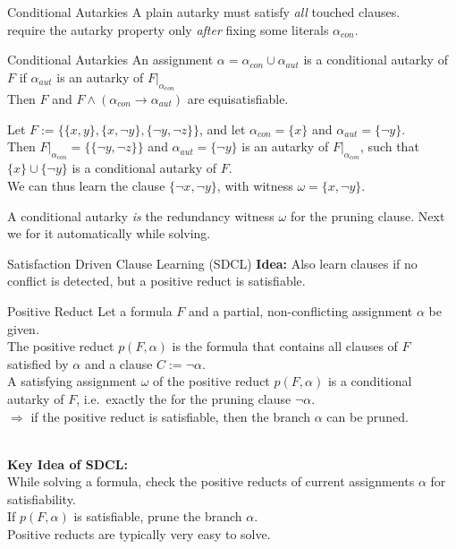 \documentclass[t]{sdqbeamer}
\begin{document}
\begin{frame}{Conditional Autarkies}
\vspace*{-2ex}
A plain autarky must satisfy \emph{all} touched clauses.\\
 require the autarky property only \emph{after} fixing some literals $\alpha_{con}$.\\[1ex]
\begin{block}{Conditional Autarkies}
An assignment $\alpha = \alpha_{con} \cup \alpha_{aut}$ is a conditional autarky of $F$ if $\alpha_{aut}$ is an autarky of $F|_{\alpha_{con}}$\\[1ex]
Then $F$ and $F \land (\alpha_{con} \rightarrow \alpha_{aut})$ are equisatisfiable.
\end{block}

\begin{example}
Let $F := \bigl\{\{x, y\}, \{x, \lnot y\}, \{\lnot y, \lnot z\}\bigr\}$, and let $\alpha_{con} = \{x\}$ and $\alpha_{aut} = \{\lnot y\}$.\\[0.5ex]
Then $F|_{\alpha_{con}} = \bigl\{\{\lnot y, \lnot z\}\bigr\}$ and $\alpha_{aut} = \{\lnot y\}$ is an autarky of $F|_{\alpha_{con}}$, such that $\{x\} \cup \{\lnot y\}$ is a conditional autarky of $F$.\\[0.5ex]
We can thus learn the clause $\{\lnot x, \lnot y\}$, with witness $\omega = \{x, \lnot y\}$.
\end{example}
A conditional autarky \emph{is} the redundancy witness $\omega$ for the pruning clause. Next we  for it automatically while solving.
\end{frame}


\begin{frame}{Satisfaction Driven Clause Learning (SDCL)}
\textbf{Idea:} Also learn clauses if no conflict is detected, but a positive reduct is satisfiable.\\[1ex]

\begin{block}{Positive Reduct}
Let a formula $F$ and a partial, non-conflicting assignment $\alpha$ be given.\\[1ex]
The positive reduct $p(F, \alpha)$ is the formula that contains all clauses of $F$ satisfied by $\alpha$ and a clause $C := \lnot \alpha$.\\[1ex]
A satisfying assignment $\omega$ of the positive reduct $p(F,\alpha)$ is a conditional autarky of $F$, i.e.\ exactly the  for the pruning clause $\lnot \alpha$.\\[1ex]
$\Rightarrow$ if the positive reduct is satisfiable, then the branch $\alpha$ can be pruned.
\end{block}~\\
\textbf{Key Idea of SDCL:}\\[1ex]
While solving a formula, check the positive reducts of current assignments $\alpha$ for satisfiability.\\[1ex]
If $p(F, \alpha)$ is satisfiable, prune the branch $\alpha$.\\[1ex]
Positive reducts are typically very easy to solve.
\end{frame}
\end{document}
